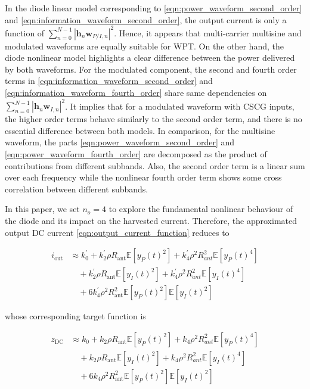 In the diode linear model corresponding to \eqref{eqn:power_waveform_second_order} and \eqref{eqn:information_waveform_second_order}, the output current is only a function of $\sum\limits_{n = 0}^{N - 1} {{{\left| {{{\mathbf{h}}_n}{{\mathbf{w}}_{P/I,n}}} \right|}^2}} $. Hence, it appears that multi-carrier multisine and modulated waveforms are equally suitable for WPT. On the other hand, the diode nonlinear model highlights a clear difference between the power delivered by both waveforms. For the modulated component, the second and fourth order terms in \eqref{eqn:information_waveform_second_order} and \eqref{eqn:information_waveform_fourth_order} share same dependencies on ${\sum\limits_{n = 0}^{N - 1} {{{\left| {{{\mathbf{h}}_n}{{\mathbf{w}}_{I,n}}} \right|}^2}} }$. It implies that for a modulated waveform with CSCG inputs, the higher order terms behave similarly to the second order term, and there is no essential difference between both models. In comparison, for the multisine waveform, the parts \eqref{eqn:power_waveform_second_order} and \eqref{eqn:power_waveform_fourth_order} are decomposed as the product of contributions from different subbands. Also, the second order term is a linear sum over each frequency while the nonlinear fourth order term shows some cross correlation between different subbands.

In this paper, we set ${n_o} = 4$ to explore the fundamental nonlinear behaviour of the diode and its impact on the harvested current. Therefore, the approximated output DC current \eqref{eqn:output_current_function} reduces to

\begin{align}\label{eqn:output_current_truncated}
  {i_{\text{out}}} &\approx k_0^\prime  + k_2^\prime \rho {R_{{\text{ant}}}}\mathbb{E}\left[ {{y_P}{{(t)}^2}} \right] + k_4^\prime {\rho ^2}R_{ant}^2\mathbb{E}\left[ {{y_P}{{(t)}^4}} \right] \nonumber \\
   &\quad + k_2^\prime \rho {R_{{\text{ant}}}}\mathbb{E}\left[ {{y_I}{{(t)}^2}} \right] + k_4^\prime {\rho ^2}R_{ant}^2\mathbb{E}\left[ {{y_I}{{(t)}^4}} \right] \nonumber \\
   &\quad + 6k_4^\prime {\rho ^2}R_{{\text{ant}}}^2\mathbb{E}\left[ {{y_P}{{(t)}^2}} \right]\mathbb{E}\left[ {{y_I}{{(t)}^2}} \right]
\end{align}

whose corresponding target function is

\begin{align}\label{eqn:target_function_truncated}
  {z_{\text{DC}}} &\approx k_0  + k_2 \rho {R_{{\text{ant}}}}\mathbb{E}\left[ {{y_P}{{(t)}^2}} \right] + k_4 {\rho ^2}R_{ant}^2\mathbb{E}\left[ {{y_P}{{(t)}^4}} \right] \nonumber \\
   &\quad + k_2 \rho {R_{{\text{ant}}}}\mathbb{E}\left[ {{y_I}{{(t)}^2}} \right] + k_4 {\rho ^2}R_{ant}^2\mathbb{E}\left[ {{y_I}{{(t)}^4}} \right] \nonumber \\
   &\quad + 6k_4 {\rho ^2}R_{{\text{ant}}}^2\mathbb{E}\left[ {{y_P}{{(t)}^2}} \right]\mathbb{E}\left[ {{y_I}{{(t)}^2}} \right]
\end{align} 